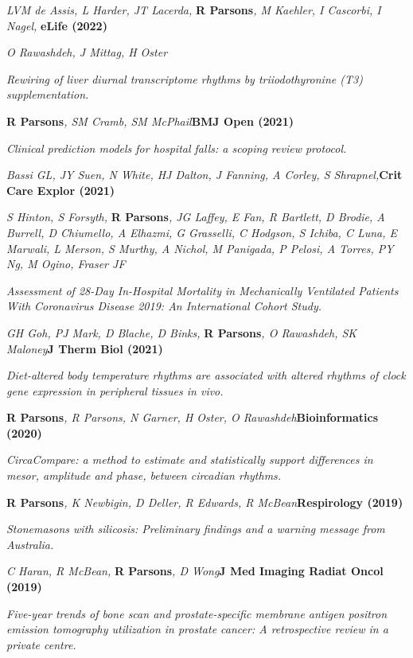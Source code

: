 \item
	\textit{LVM de Assis, L Harder, JT Lacerda, }\textbf{R Parsons}\textit{, M Kaehler, I Cascorbi, I Nagel, }\textbf{\hfill eLife (2022)}\par
	\textit{O Rawashdeh, J Mittag, H Oster}\par
    \textit{Rewiring of liver diurnal transcriptome rhythms by triiodothyronine (T3) supplementation.}
\item
    \textbf{R Parsons}\textit{, SM Cramb, SM McPhail}\textbf{\hfill BMJ Open (2021)}\par 
    \textit{Clinical prediction models for hospital falls: a scoping review protocol.}
\item
    \textit{Bassi GL, JY Suen, N White, HJ Dalton, J Fanning, A Corley, S Shrapnel,}\textbf{\hfill Crit Care Explor (2021)}\par
	\textit{S Hinton, S Forsyth, }\textbf{R Parsons}\textit{, JG Laffey, E Fan, R Bartlett, D Brodie, A Burrell, D Chiumello, A Elhazmi, G Grasselli, C Hodgson, S Ichiba, C Luna, E Marwali, L Merson, S Murthy, A Nichol, M Panigada, P Pelosi, A Torres, PY Ng, M Ogino, Fraser JF}\par
    \textit{Assessment of 28-Day In-Hospital Mortality in Mechanically Ventilated Patients With Coronavirus Disease 2019: An International Cohort Study.}
\item
    \textit{GH Goh, PJ Mark, D Blache, D Binks, }\textbf{R Parsons}\textit{, O Rawashdeh, SK Maloney}\textbf{\hfill J Therm Biol (2021)}\par 
    \textit{Diet-altered body temperature rhythms are associated with altered rhythms of clock gene expression in peripheral tissues in vivo.}
\item
    \textbf{R Parsons}\textit{, R Parsons, N Garner, H Oster, O Rawashdeh}\textbf{\hfill Bioinformatics (2020)}\par 
    \textit{CircaCompare: a method to estimate and statistically support differences in mesor, amplitude and phase, between circadian rhythms.}
\item
    \textbf{R Parsons}\textit{, K Newbigin, D Deller, R Edwards, R McBean}\textbf{\hfill Respirology (2019)}\par 
    \textit{Stonemasons with silicosis: Preliminary findings and a warning message from Australia.}
\item
    \textit{C Haran, R McBean, }\textbf{R Parsons}\textit{, D Wong}\textbf{\hfill J Med Imaging Radiat Oncol (2019)}\par 
    \textit{Five-year trends of bone scan and prostate-specific membrane antigen positron emission tomography utilization in prostate cancer: A retrospective review in a private centre.}
